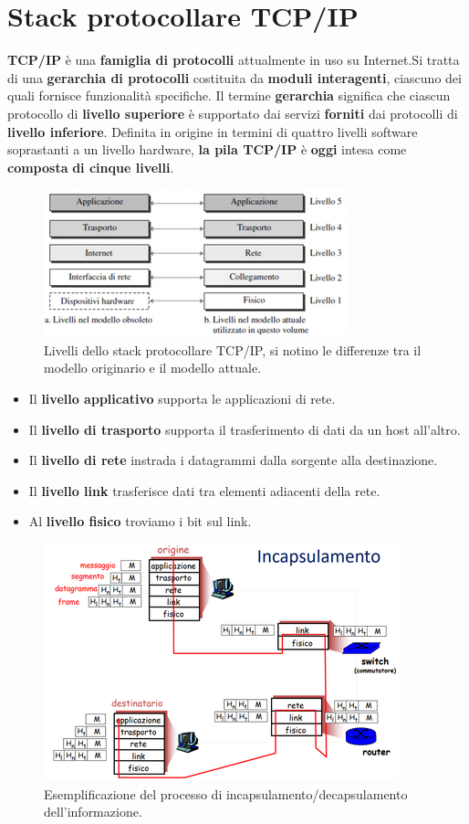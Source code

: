 \documentclass[11pt,a4paper]{article}
\theoremstyle{definition}
\begin{document}
\section{Stack protocollare TCP/IP}
\textbf{TCP/IP} è una \textbf{famiglia di protocolli} attualmente
in uso su Internet.\newline Si tratta di una \textbf{gerarchia di
	protocolli} costituita da \textbf{moduli interagenti}, ciascuno dei
quali fornisce funzionalità specifiche.
Il termine \textbf{gerarchia} significa che ciascun protocollo di
\textbf{livello superiore} è supportato dai servizi \textbf{forniti} dai
protocolli di \textbf{livello inferiore}.
Definita in origine in termini di quattro livelli software
soprastanti a un livello hardware, \textbf{la pila TCP/IP} è \textbf{oggi}
intesa come \textbf{composta} \textbf{di cinque livelli}.
\begin{figure}[!h]
	\includegraphics[scale=0.6]{Immagini/TCP_IP.png}
	\centering
	\caption{Livelli dello stack protocollare TCP/IP, si notino le differenze tra il modello originario e il modello attuale.}
\end{figure}
\begin{itemize}
	\item Il \textbf{livello applicativo} supporta le applicazioni di rete.
	\item Il \textbf{livello di trasporto} supporta il trasferimento di dati da un host all'altro.
	\item Il \textbf{livello di rete} instrada i datagrammi dalla sorgente alla destinazione.
	\item Il \textbf{livello link} trasferisce dati tra elementi adiacenti della rete.
	\item  Al \textbf{livello fisico} troviamo i bit sul link.
\end{itemize}
\begin{figure}[!h]
	\includegraphics[scale=0.5]{Immagini/Incapsulamento_m.png}
	\centering
	\caption{Esemplificazione del processo di incapsulamento/decapsulamento dell'informazione.}
\end{figure}
\end{document}
